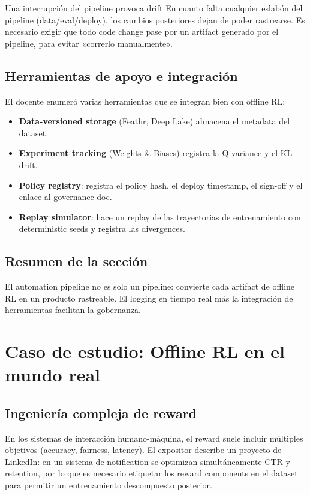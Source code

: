 \documentclass[a4paper]{article}
\begin{document}
\begin{warningbox}{Una interrupción del pipeline provoca drift}
En cuanto falta cualquier eslabón del pipeline (data/eval/deploy), los cambios posteriores dejan de poder rastrearse. Es necesario exigir que todo code change pase por un artifact generado por el pipeline, para evitar «correrlo manualmente».
\end{warningbox}

\subsection{Herramientas de apoyo e integración}

El docente enumeró varias herramientas que se integran bien con offline RL:

\begin{itemize}
    \item \textbf{Data-versioned storage} (Feathr, Deep Lake) almacena el metadata del dataset.
    \item \textbf{Experiment tracking} (Weights \& Biases) registra la Q variance y el KL drift.
    \item \textbf{Policy registry}: registra el policy hash, el deploy timestamp, el sign-off y el enlace al governance doc.
    \item \textbf{Replay simulator}: hace un replay de las trayectorias de entrenamiento con deterministic seeds y registra las divergences.
\end{itemize}

\subsection{Resumen de la sección}

El automation pipeline no es solo un pipeline: convierte cada artifact de offline RL en un producto rastreable. El logging en tiempo real más la integración de herramientas facilitan la gobernanza.
\section{Caso de estudio: Offline RL en el mundo real}

\subsection{Ingeniería compleja de reward}

En los sistemas de interacción humano-máquina, el reward suele incluir múltiples objetivos (accuracy, fairness, latency). El expositor describe un proyecto de LinkedIn: en un sistema de notification se optimizan simultáneamente CTR y retention, por lo que es necesario etiquetar los reward components en el dataset para permitir un entrenamiento descompuesto posterior.
\end{document}

